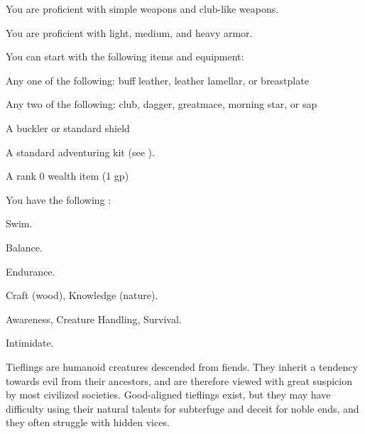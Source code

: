       You are proficient with simple weapons and club-like weapons.

      You are proficient with light, medium, and heavy armor.

    You can start with the following items and equipment:
    \begin{raggeditemize}
        \item Any one of the following: buff leather, leather lamellar, or breastplate
        \item Any two of the following: club, dagger, greatmace, morning star, or sap
        \item A buckler or standard shield
        \item A standard adventuring kit (see ).
        \item A rank 0 wealth item (1 gp)
    \end{raggeditemize}

      You have the following :
      \begin{raggeditemize}
        \item {} Swim.
        \item {} Balance.
        \item {} Endurance.
        \item {} Craft (wood), Knowledge (nature).
        \item {} Awareness, Creature Handling, Survival.
        \item {} Intimidate.
      \end{raggeditemize}


  Tieflings are humanoid creatures descended from fiends.
  They inherit a tendency towards evil from their ancestors, and are therefore viewed with great suspicion by most civilized societies.
  Good-aligned tieflings exist, but they may have difficulty using their natural talents for subterfuge and deceit for noble ends, and they often struggle with hidden vices.

